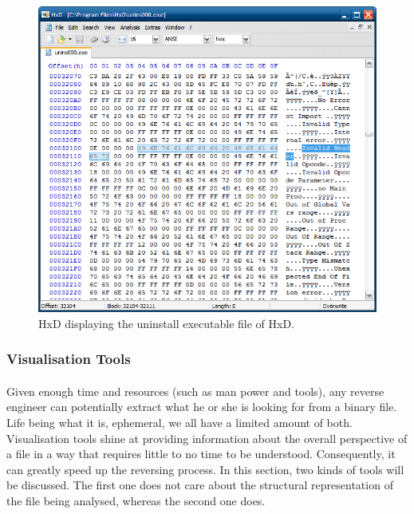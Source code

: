 \begin{figure}[!htb]
	\centering
	\includegraphics[width=1\textwidth]{reverse_engineering/hex_editor.png}
	\caption{HxD displaying the uninstall executable file of HxD.}
	\label{fig:hex_editor}
\end{figure}

\subsubsection{Visualisation Tools}
\paragraph{}
Given enough time and resources (such as man power and tools), any reverse engineer can potentially extract what he or she is looking for from a binary file. Life being what it is, ephemeral, we all have a limited amount of both. Visualisation tools shine at providing information about the overall perspective of a file in a way that requires little to no time to be understood. Consequently, it can greatly speed up the reversing process. In this section, two kinds of tools will be discussed. The first one does not care about the structural representation of the file being analysed, whereas the second one does.

